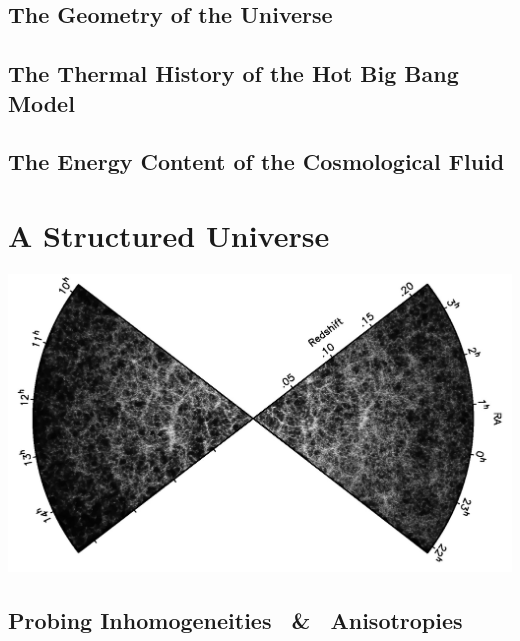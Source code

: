 \documentclass[11pt, twoside, a4paper, openright]{report}
\begin{document}
	

	\section{The Geometry of the Universe}
	\label{sec:geometry}
	
	
	\section{The Thermal History of the Hot Big Bang Model}
	\label{sec:thermal}
	

	\section{The Energy Content of the Cosmological Fluid}
	\label{sec:inventory}
	



\setcounter{chapter}{2}
\chapter{A Structured Universe}
{\color{purple}\titlerule[2.5pt]}
\vspace{4pc}%
\label{chap:structure}
{\centering
\includegraphics[width=\textwidth]{2dfgrs.png}}
\clearpage

	
	
	\section{Probing Inhomogeneities ~\&~ Anisotropies}
	\label{sec:PS}
	
\end{document}
